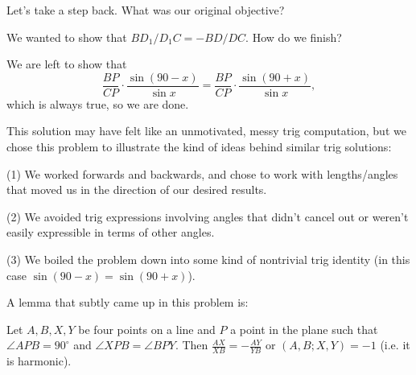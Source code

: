 Let's take a step back. What was our original objective?





We wanted to show that $BD_1/D_1C = -BD/DC$. How do we finish?


We are left to show that $$\frac{BP}{CP}\cdot \frac{\sin (90-x)}{\sin x} =  \frac{BP}{CP}\cdot \frac{\sin(90+x)}{\sin x},$$ which is always true, so we are done.

This solution may have felt like an unmotivated, messy trig computation, but we chose this problem to illustrate the kind of ideas behind similar trig solutions: 


(1) We worked forwards and backwards, and chose to work with lengths/angles that moved us in the direction of our desired results. 


(2) We avoided trig expressions involving angles that didn't cancel out or weren't easily expressible in terms of other angles. 


(3) We boiled the problem down into some kind of nontrivial trig identity (in this case $\sin(90-x) = \sin(90+x)$).

A lemma that subtly came up in this problem is: 
\begin{lemma}
    Let $A, B, X, Y$ be four points on a line and $P$ a point in the plane such that $\angle APB = 90^\circ$ and $\angle XPB = \angle BPY$. Then $\frac{AX}{XB} = -\frac{AY}{YB}$ or $(A,B;X,Y) = -1$ (i.e. it is harmonic).    
\end{lemma}





